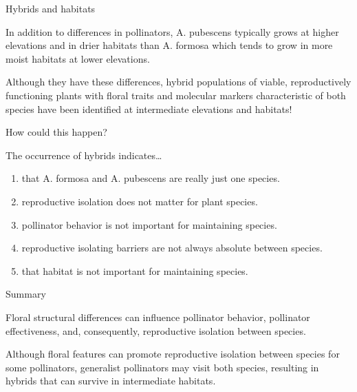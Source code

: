 \documentclass[t,hidelinks]{beamer}
\newcommand{\ques}[1]{\highlight{\textsc{q#1:}}}
\begin{document}
%
\begin{frame}[t]{Hybrids and habitats}
	
	\hangpara In addition to differences in pollinators, A. pubescens typically grows at higher elevations and in drier habitats than A. formosa which tends to grow in more moist habitats at lower elevations.

	\hangpara Although they have these differences, hybrid populations of viable, reproductively functioning plants with floral traits and molecular markers characteristic of both species have been identified at intermediate elevations and habitats!

	\hangpara How could this happen? 

\end{frame}
%
\begin{frame}[t]{\ques{16} The occurrence of hybrids indicates\dots}
	
	\begin{enumerate}
		\item that A. formosa and A. pubescens are really just one species.
		\item reproductive isolation does not matter for plant species.
		\item pollinator behavior is not important for maintaining species.
		\item reproductive isolating barriers are not always absolute between species.
		\item that habitat is not important for maintaining species.
	\end{enumerate}
\end{frame}
%
\begin{frame}[t]{Summary}
	
	\hangpara Floral structural differences can influence pollinator behavior, pollinator effectiveness, and, consequently, reproductive isolation between species. 

	\hangpara Although floral features can promote reproductive isolation between species for some pollinators, generalist pollinators may visit both species, resulting in hybrids that can survive in intermediate habitats. 
\end{frame}
%
\end{document}
